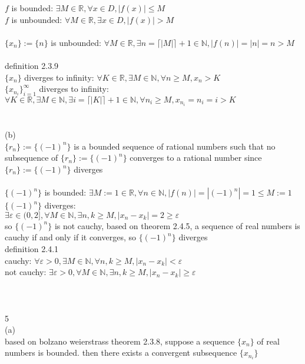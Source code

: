 \documentclass[12pt, border = 4pt, multi]{article} %
\begin{document}
$f$ is bounded: $\exists M \in \mathbb{R}, \forall x \in D, |f(x)| \leq M$\\
$f$ is unbounded: $\forall M \in \mathbb{R}, \exists x \in D, |f(x)| > M$\\
\\
$\{x_n\} := \{n\}$ is unbounded: $\forall M \in \mathbb{R}, \exists n = \lceil|M|\rceil + 1 \in \mathbb{N}, |f(n)| = |n| = n > M$\\
\\
definition 2.3.9\\
$\{x_n\}$ diverges to infinity: $\forall K \in \mathbb{R}, \exists M \in \mathbb{N}, \forall n \geq M, x_n > K$\\
$\{x_{n_i}\}_{i = 1} ^ {\infty}$ diverges to infinity: $\forall K \in \mathbb{R}, \exists M \in \mathbb{N}, \exists i = \lceil|K|\rceil + 1 \in \mathbb{N}, \forall n_i \geq M, x_{n_i} = n_i = i > K$\\
\\
\\
(b)\\
$\{r_n\} := \{(-1) ^ n\}$ is a bounded sequence of rational numbers such that no subsequence of $\{r_n\} := \{(-1) ^ n\}$ converges to a rational number since $\{r_n\} := \{(-1) ^ n\}$ diverges\\
\\
$\{(-1) ^ n\}$ is bounded: $\exists M := 1 \in \mathbb{R}, \forall n \in \mathbb{N}, |f(n)| = |(-1) ^ n| = 1 \leq M := 1$\\
$\{(-1) ^ n\}$ diverges:\\
$\exists \varepsilon \in (0, 2], \forall M \in \mathbb{N}, \exists n, k \geq M, |x_n - x_k| = 2 \geq \varepsilon$\\
so $\{(-1) ^ n\}$ is not cauchy, based on theorem 2.4.5, a sequence of real numbers is cauchy if and only if it converges, so $\{(-1) ^ n\}$ diverges\\
definition 2.4.1\\
cauchy: $\forall \varepsilon > 0, \exists M \in \mathbb{N}, \forall n, k \geq M, |x_n - x_k| < \varepsilon$\\
not cauchy: $\exists \varepsilon > 0, \forall M \in \mathbb{N}, \exists n, k \geq M, |x_n - x_k| \geq \varepsilon$\\
\\
\\
\\
5\\
(a)\\
based on bolzano weierstrass theorem 2.3.8, suppose a sequence $\{x_n\}$ of real numbers is bounded. then there exists a convergent subsequence $\{x_{n_i}\}$\\
\end{document}
